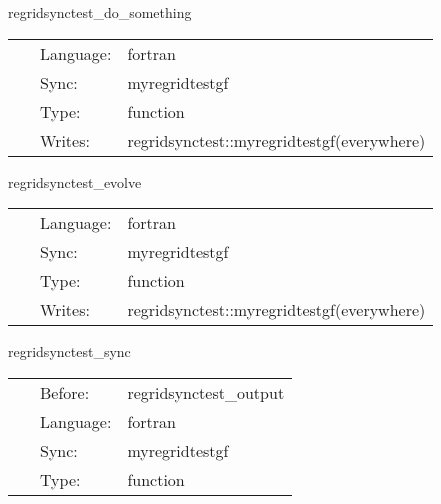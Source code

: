 \vspace{5mm}


\hspace{5mm} regridsynctest\_do\_something 

\hspace{5mm}{\it do something at postregrid and try to sync } 


\hspace{5mm}

 \begin{tabular*}{160mm}{cll} 
~ & Language:  & fortran \\ 
~ & Sync:  & myregridtestgf \\ 
~ & Type:  & function \\ 
~ & Writes:  & regridsynctest::myregridtestgf(everywhere) \\ 
\end{tabular*} 


\vspace{5mm}


\hspace{5mm} regridsynctest\_evolve 

\hspace{5mm}{\it do something at evol } 


\hspace{5mm}

 \begin{tabular*}{160mm}{cll} 
~ & Language:  & fortran \\ 
~ & Sync:  & myregridtestgf \\ 
~ & Type:  & function \\ 
~ & Writes:  & regridsynctest::myregridtestgf(everywhere) \\ 
\end{tabular*} 


\vspace{5mm}


\hspace{5mm} regridsynctest\_sync 

\hspace{5mm}{\it dummy routine for sync-ing } 


\hspace{5mm}

 \begin{tabular*}{160mm}{cll} 
~ & Before:  & regridsynctest\_output \\ 
~ & Language:  & fortran \\ 
~ & Sync:  & myregridtestgf \\ 
~ & Type:  & function \\ 
\end{tabular*} 


